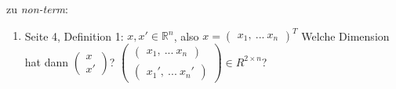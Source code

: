 zu \textit{non-term}:
\begin{enumerate}
	\item Seite 4, Definition 1: \newline
		$x,x' \in \mathbb{R}^n$, also $x=\begin{pmatrix}x_1,\ ... \ x_n\end{pmatrix}^T$ \newline
		Welche Dimension hat dann $\begin{pmatrix}x\\ x'\end{pmatrix}$?\newline
		$\begin{pmatrix}
					\begin{pmatrix}x_1,\ ... \ x_n\end{pmatrix} \\
					\begin{pmatrix}x_1',\ ... \ x_n'\end{pmatrix}
		\end{pmatrix} \in R^{2\times n}$?
\end{enumerate}